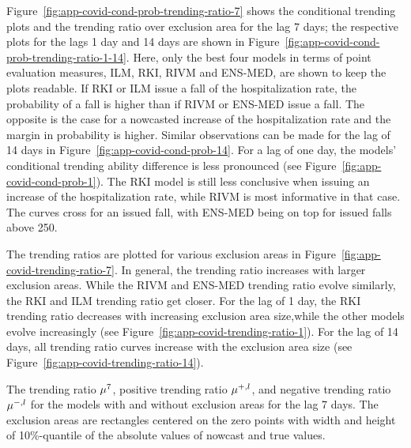 Figure~\ref{fig:app-covid-cond-prob-trending-ratio-7} shows the conditional trending plots and the trending ratio over exclusion area for the lag 7 days; the respective plots for the lags 1 day and 14 days are shown in Figure~\ref{fig:app-covid-cond-prob-trending-ratio-1-14}.
Here, only the best four models in terms of point evaluation measures, ILM, RKI, RIVM and ENS-MED, are shown to keep the plots readable.
If RKI or ILM issue a fall of the hospitalization rate, the probability of a fall is higher than if RIVM or ENS-MED issue a fall.
The opposite is the case for a nowcasted increase of the hospitalization rate and the margin in probability is higher.
Similar observations can be made for the lag of 14 days in Figure~\ref{fig:app-covid-cond-prob-14}.
For a lag of one day, the models' conditional trending ability difference is less pronounced (see Figure~\ref{fig:app-covid-cond-prob-1}).
The RKI model is still less conclusive when issuing an increase of the hospitalization rate, while RIVM is most informative in that case.
The curves cross for an issued fall, with ENS-MED being on top for issued falls above 250.

The trending ratios are plotted for various exclusion areas in Figure~\ref{fig:app-covid-trending-ratio-7}.
In general, the trending ratio increases with larger exclusion areas.
While the RIVM and ENS-MED trending ratio evolve similarly, the RKI and ILM trending ratio get closer.
For the lag of 1 day, the RKI trending ratio decreases with increasing exclusion area size,while the other models evolve increasingly (see Figure~\ref{fig:app-covid-trending-ratio-1}).
For the lag of 14 days, all trending ratio curves increase with the exclusion area size (see Figure~\ref{fig:app-covid-trending-ratio-14}).

\begin{table}
    \centering
    \tiny
    
    \caption{The trending ratio $\accl[7]$, positive trending ratio $\accpl[l]$, and negative trending ratio $\accml[l]$ for the models with and without exclusion areas for the lag 7 days. The exclusion areas are rectangles centered on the zero points with width and height of 10\%-quantile of the absolute values of nowcast and true values. }
    \label{tab:app-covid-trending-ratios-lag-7}
\end{table}

